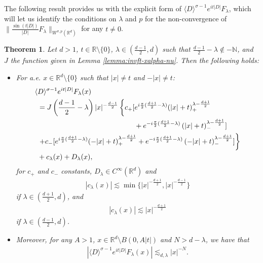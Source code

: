 \documentclass[a4paper, reqno, 11pt]{amsart}
\newtheorem{theorem}{Theorem}[section]
\theoremstyle{definition}
\begin{document}
The following result provides us with the explicit form of $\langle D \rangle^{\sigma-1} e^{it|D|} F_{\lambda}$, which will let us identify the conditions on $\lambda$ and $p$ for the non-convergence of $\|\frac{\sin(t|D|)}{|D|} F_{\lambda}\|_{W^{\sigma,p}(\mathbb{R}^d)}$ for any $t \neq 0$.
\begin{theorem}\label{thm:flambda-tnotzero}
Let $d>1$, $t \in \mathbb{R} \setminus \{0\}$, $\lambda \in (\frac{d-1}{2},d)$ such that $\frac{d-1}{2} - \lambda \notin -\mathbb{N}$, and $J$ the function given in Lemma \ref{lemma:invft-xalpha-nu}. Then the following holds:
\begin{itemize}
\item For a.e. $x \in \mathbb{R}^d \setminus \{0\}$ such that $|x| \neq t$ and $-|x| \neq t$:
\begin{align*}
\langle &D \rangle^{\sigma-1} e^{it|D|} F_{\lambda}(x) \nonumber \\
&= J\left(\frac{d-1}{2}-\lambda\right)  |x|^{-\frac{d-1}{2}} \left\{ c_+ [ e^{i\frac{\pi}{2}(\frac{d+1}{2} - \lambda)} (|x| + t)_+^{\lambda-\frac{d+1}{2}}\right. \\
&\hspace{48mm} + e^{-i\frac{\pi}{2}(\frac{d+1}{2} - \lambda)} \left(|x| + t\right)_-^{\lambda-\frac{d+1}{2}}] \nonumber \\
&\left. + c_-  [ e^{i\frac{\pi}{2}(\frac{d+1}{2} - \lambda)}(-|x| + t)_+^{\lambda-\frac{d+1}{2}} + e^{-i\frac{\pi}{2}(\frac{d+1}{2} - \lambda)} \left( -|x| + t\right)_-^{\lambda-\frac{d+1}{2}} ] \right\} \nonumber  \\
&+ c_{\lambda}(x) + D_{\lambda}(x),
\end{align*}
for $c_+$ and $c_-$ constants, $D_{\lambda} \in C^{\infty}(\mathbb{R}^d)$ and 
\begin{align*}
|c_{\lambda}(x)| \lesssim \min\{|x|^{-\frac{d+1}{2}} , |x|^{-\frac{d-1}{2}}\}
\end{align*}
if $\lambda \in (\frac{d+1}{2},d)$, and 
\begin{align*}
|c_{\lambda}(x)| \lesssim |x|^{-\frac{d+1}{2}}
\end{align*}
if $\lambda \in (\frac{d-1}{2},d)$.

\item  Moreover, for any $A > 1$, $x \in \mathbb{R}^d \setminus B(0,A|t|)$ and $N > d - \lambda$, we have that
\begin{align*}
|\langle D \rangle^{\sigma-1} e^{it|D|} F_{\lambda}(x)| \lesssim_{d,\lambda} |x|^{-N}.
\end{align*}

\end{itemize}
\end{theorem}
\end{document}

